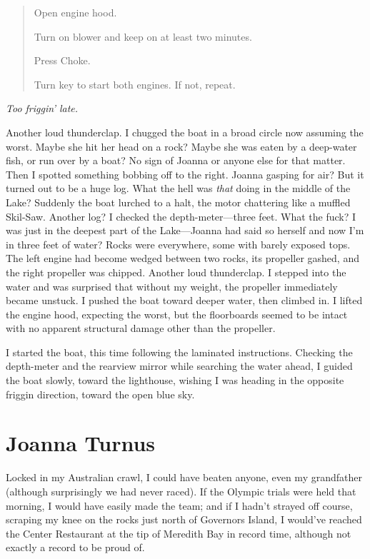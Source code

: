\begin{quote}
Open engine hood.

Turn on blower and keep on at least two minutes.

Press Choke.

Turn key to start both engines. If not, repeat.
\end{quote}

\noindent \emph{Too friggin' late.}

Another loud thunderclap. I chugged the boat in a broad circle now
assuming the worst. Maybe she hit her head on a rock? Maybe she was
eaten by a deep-water fish, or run over by a boat? No sign of Joanna or
anyone else for that matter. Then I spotted something bobbing off to the
right. Joanna gasping for air? But it turned out to be a huge log. What
the hell was \emph{that} doing in the middle of the Lake? Suddenly the
boat lurched to a halt, the motor chattering like a muffled Skil-Saw.
Another log? I checked the depth-meter---three feet. What the fuck? I
was just in the deepest part of the Lake---Joanna had said so herself
and now I'm in three feet of water? Rocks were everywhere, some with
barely exposed tops. The left engine had become wedged between two
rocks, its propeller gashed, and the right propeller was chipped.
Another loud thunderclap. I stepped into the water and was surprised
that without my weight, the propeller immediately became unstuck. I
pushed the boat toward deeper water, then climbed in. I lifted the
engine hood, expecting the worst, but the floorboards seemed to be
intact with no apparent structural damage other than the propeller.

I started the boat, this time following the laminated instructions.
Checking the depth-meter and the rearview mirror while searching the
water ahead, I guided the boat slowly, toward the lighthouse, wishing I
was heading in the opposite friggin direction, toward the open blue sky.

\chapter{Joanna Turnus}

\titlemark

Locked in my Australian crawl, I could have beaten anyone, even my
grandfather (although surprisingly we had never raced). If the Olympic
trials were held that morning, I would have easily made the team; and if
I hadn't strayed off course, scraping my knee on the rocks just north of
Governors Island, I would've reached the Center Restaurant at the tip of
Meredith Bay in record time, although not exactly a record to be proud
of.

